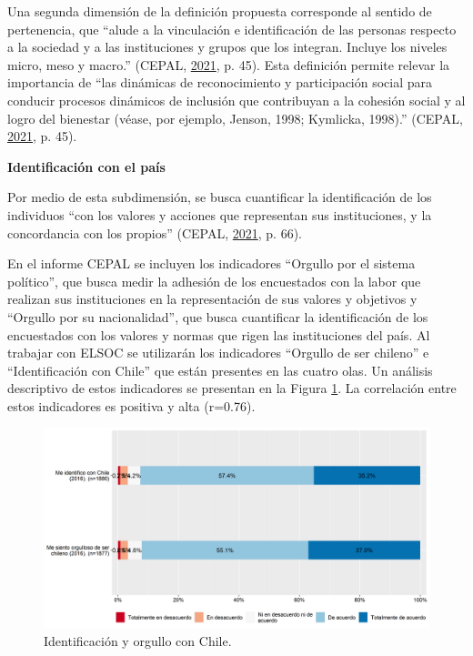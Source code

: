 \documentclass[
  12pt,
]{book}
\begin{document}
Una segunda dimensión de la definición propuesta corresponde al sentido de pertenencia, que ``alude a la vinculación e identificación de las personas respecto a la sociedad y a las instituciones y grupos que los integran. Incluye los niveles micro, meso y macro.'' (CEPAL, \protect\hyperlink{ref-cepal_Cohesion_2021}{2021}, p. 45). Esta definición permite relevar la importancia de ``las dinámicas de reconocimiento y participación social para conducir procesos dinámicos de inclusión que contribuyan a la cohesión social y al logro del bienestar (véase, por ejemplo, Jenson, 1998; Kymlicka, 1998).'' (CEPAL, \protect\hyperlink{ref-cepal_Cohesion_2021}{2021}, p. 45).

\textbf{Identificación con el país}

Por medio de esta subdimensión, se busca cuantificar la identificación de los individuos ``con los valores y acciones que representan sus instituciones, y la concordancia con los propios'' (CEPAL, \protect\hyperlink{ref-cepal_Cohesion_2021}{2021}, p. 66).

En el informe CEPAL se incluyen los indicadores ``Orgullo por el sistema político'', que busca medir la adhesión de los encuestados con la labor que realizan sus instituciones en la representación de sus valores y objetivos y ``Orgullo por su nacionalidad'', que busca cuantificar la identificación de los encuestados con los valores y normas que rigen las instituciones del país. Al trabajar con ELSOC se utilizarán los indicadores ``Orgullo de ser chileno'' e ``Identificación con Chile'' que están presentes en las cuatro olas. Un análisis descriptivo de estos indicadores se presentan en la Figura \ref{fig:identificacion}. La correlación entre estos indicadores es positiva y alta (r=0.76).

\begin{figure}[H]

{\centering \includegraphics[width=1\linewidth,height=1\textheight]{output/graphs/identificacion} 

}

\caption{Identificación y orgullo con Chile.}\label{fig:identificacion}
\end{figure}
\end{document}
